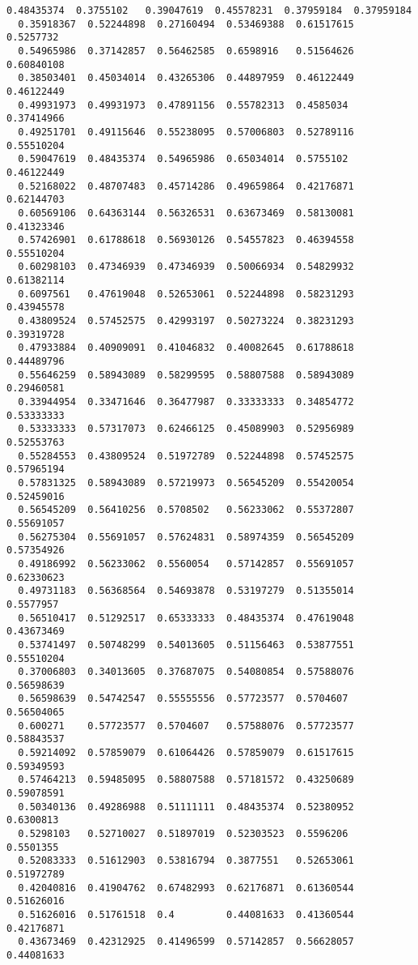 \documentclass[11pt]{article}
\begin{document}
\begin{Verbatim}[commandchars=\\\{\}]
  0.48435374  0.3755102   0.39047619  0.45578231  0.37959184  0.37959184
  0.35918367  0.52244898  0.27160494  0.53469388  0.61517615  0.5257732
  0.54965986  0.37142857  0.56462585  0.6598916   0.51564626  0.60840108
  0.38503401  0.45034014  0.43265306  0.44897959  0.46122449  0.46122449
  0.49931973  0.49931973  0.47891156  0.55782313  0.4585034   0.37414966
  0.49251701  0.49115646  0.55238095  0.57006803  0.52789116  0.55510204
  0.59047619  0.48435374  0.54965986  0.65034014  0.5755102   0.46122449
  0.52168022  0.48707483  0.45714286  0.49659864  0.42176871  0.62144703
  0.60569106  0.64363144  0.56326531  0.63673469  0.58130081  0.41323346
  0.57426901  0.61788618  0.56930126  0.54557823  0.46394558  0.55510204
  0.60298103  0.47346939  0.47346939  0.50066934  0.54829932  0.61382114
  0.6097561   0.47619048  0.52653061  0.52244898  0.58231293  0.43945578
  0.43809524  0.57452575  0.42993197  0.50273224  0.38231293  0.39319728
  0.47933884  0.40909091  0.41046832  0.40082645  0.61788618  0.44489796
  0.55646259  0.58943089  0.58299595  0.58807588  0.58943089  0.29460581
  0.33944954  0.33471646  0.36477987  0.33333333  0.34854772  0.53333333
  0.53333333  0.57317073  0.62466125  0.45089903  0.52956989  0.52553763
  0.55284553  0.43809524  0.51972789  0.52244898  0.57452575  0.57965194
  0.57831325  0.58943089  0.57219973  0.56545209  0.55420054  0.52459016
  0.56545209  0.56410256  0.5708502   0.56233062  0.55372807  0.55691057
  0.56275304  0.55691057  0.57624831  0.58974359  0.56545209  0.57354926
  0.49186992  0.56233062  0.5560054   0.57142857  0.55691057  0.62330623
  0.49731183  0.56368564  0.54693878  0.53197279  0.51355014  0.5577957
  0.56510417  0.51292517  0.65333333  0.48435374  0.47619048  0.43673469
  0.53741497  0.50748299  0.54013605  0.51156463  0.53877551  0.55510204
  0.37006803  0.34013605  0.37687075  0.54080854  0.57588076  0.56598639
  0.56598639  0.54742547  0.55555556  0.57723577  0.5704607   0.56504065
  0.600271    0.57723577  0.5704607   0.57588076  0.57723577  0.58843537
  0.59214092  0.57859079  0.61064426  0.57859079  0.61517615  0.59349593
  0.57464213  0.59485095  0.58807588  0.57181572  0.43250689  0.59078591
  0.50340136  0.49286988  0.51111111  0.48435374  0.52380952  0.6300813
  0.5298103   0.52710027  0.51897019  0.52303523  0.5596206   0.5501355
  0.52083333  0.51612903  0.53816794  0.3877551   0.52653061  0.51972789
  0.42040816  0.41904762  0.67482993  0.62176871  0.61360544  0.51626016
  0.51626016  0.51761518  0.4         0.44081633  0.41360544  0.42176871
  0.43673469  0.42312925  0.41496599  0.57142857  0.56628057  0.44081633

\end{Verbatim}
\end{document}
